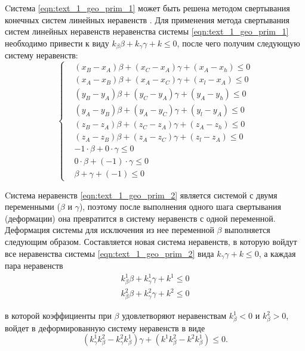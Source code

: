 Cистема \eqref{eqn:text_1_geo_prim_1} может быть решена методом свертывания конечных систем линейных неравенств \cite{Chernikov1963}\label{term:method_svert_sys_neravenstv}.
Для применения метода свертывания систем линейных неравенств неравенства системы \eqref{eqn:text_1_geo_prim_1} необходимо привести к виду $k_{\beta}\beta + k_{\gamma}\gamma + k \le 0$, после чего получим следующую систему неравенств:
\begin{equation}\label{eqn:text_1_geo_prim_2}
	\left\{
		\begin{aligned}
			& (x_B - x_A) \beta + (x_C - x_A) \gamma + (x_A - x_h) \le 0 \\
			& (x_A - x_B) \beta + (x_A - x_C) \gamma + (x_l - x_A) \le 0 \\
			& (y_B - y_A) \beta + (y_C - y_A) \gamma + (y_A - y_h) \le 0 \\
			& (y_A - y_B) \beta + (y_A - y_C) \gamma + (y_l - y_A) \le 0 \\
			& (z_B - z_A) \beta + (z_C - z_A) \gamma + (z_A - z_h) \le 0 \\
			& (z_A - z_B) \beta + (z_A - z_C) \gamma + (z_l - z_A) \le 0 \\
			& -1 \cdot \beta + 0 \cdot \gamma \le 0 \\
			& 0 \cdot \beta + (-1) \cdot \gamma \le 0 \\
			& \beta + \gamma + (-1) \le 0
		\end{aligned}
	\right.
\end{equation}

Cистема неравенств \eqref{eqn:text_1_geo_prim_2} является системой с двумя переменными ($\beta$ и $\gamma$), поэтому после выполнения одного шага свертывания (деформации)\label{term:deform_sys_lin_neravenstv} она превратится в систему неравенств с одной переменной.
Деформация системы для исключения из нее переменной $\beta$ выполняется следующим образом.
Составляется новая система неравенств, в которую войдут все неравенства системы \eqref{eqn:text_1_geo_prim_2} вида $k_{\gamma} \gamma + k \le 0$, а каждая пара неравенств
\begin{equation}
	\begin{aligned}
		k_{\beta}^1 \beta + k_{\gamma}^1 \gamma + k^1 \le 0 \\
		k_{\beta}^2 \beta + k_{\gamma}^2 \gamma + k^2 \le 0
	\end{aligned}
\end{equation}

в которой коэффициенты при $\beta$ удовлетворяют неравенствам $k_{\beta}^1 < 0$ и $k_{\beta}^2 > 0$, войдет в деформированную систему неравенств в виде
\begin{equation}
	(k_{\gamma}^1 k_{\beta}^2 - k_{\gamma}^2 k_{\beta}^1) \gamma + (k^1 k_{\beta}^2 - k^2 k_{\beta}^1) \le 0. 
\end{equation}

